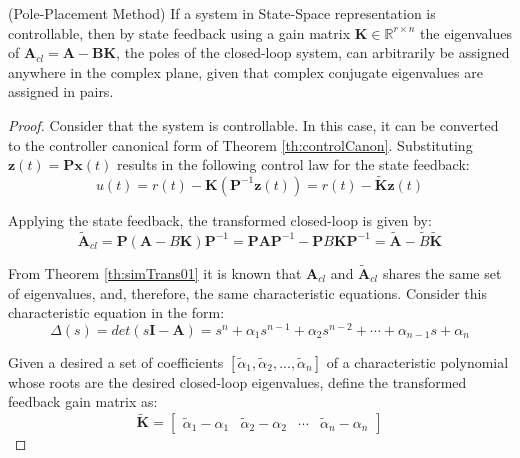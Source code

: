 \documentclass[a4paper,11pt]{book}
\numberwithin{figure}{chapter}
\numberwithin{equation}{chapter}
\numberwithin{table}{chapter}
\newtheorem{theorem}{Theorem}[chapter]
\theoremstyle{definition}
\newcounter{boxed-theorem}
\newenvironment{boxed-theorem}[1]
{\begin{shaded} \begin{theorem}{#1}}
{\end{theorem} \end{shaded}}
\newcounter{boxed-definition}
\begin{document}
\begin{boxed-theorem}{(Pole-Placement Method)} \label{th:polePlace}
	If a system in State-Space representation is controllable, then by state feedback using a gain matrix $\bm{K} \in \mathbb{R}^{r \times n}$ the eigenvalues of $\bm{A}_{cl}=\bm{A}-\bm{B}\bm{K}$, the poles of the closed-loop system, can arbitrarily be assigned anywhere in the complex plane, given that complex conjugate eigenvalues are assigned in pairs.
\end{boxed-theorem} 

\begin{proof}
	Consider that the system is controllable. In this case, it can be converted to the controller canonical form of Theorem \ref{th:controlCanon}. Substituting $\bm{z}(t) = \bm{P} \bm{x}(t)$ results in the following control law for the state feedback:
	\begin{equation}
		u(t) = r(t) - \bm{K} \left( \bm{P}^{-1} \bm{z}(t) \right) = r(t) - \tilde{\bm{K}} \bm{z}(t)
	\end{equation}
	
	Applying the state feedback, the transformed closed-loop is given by:
	\begin{equation} \label{eq:fdbckContrCanon}
	\tilde{\bm{A}}_{cl} = \bm{P} (\bm{A} - B \bm{K}) \bm{P}^{-1} = \bm{P} \bm{A} \bm{P}^{-1} - \bm{P} B \bm{K} \bm{P}^{-1} = \tilde{\bm{A}} - \tilde{B} \tilde{\bm{K}}
	\end{equation}	 
	
	From Theorem \ref{th:simTrans01} it is known that $\bm{A}_{cl}$ and $\tilde{\bm{A}}_{cl}$ shares the same set of eigenvalues, and, therefore, the same characteristic equations. Consider this characteristic equation in the form:
	\begin{equation}
		\Delta(s) = det(s\bm{I} - \bm{A}) = s^n + \alpha_1 s^{n-1} + \alpha_2 s^{n-2} + \cdots + \alpha_{n-1} s + \alpha_n
	\end{equation}
	
	Given a desired a set of coefficients $[\tilde{\alpha}_1, \tilde{\alpha}_2, ..., \tilde{\alpha}_n]$ of a characteristic polynomial whose roots are the desired closed-loop eigenvalues, define the transformed feedback gain matrix as:
	\begin{equation}
		\tilde{\bm{K}} = \begin{bmatrix} \tilde{\alpha}_1 - \alpha_1 & \tilde{\alpha}_2 - \alpha_2 & \cdots & \tilde{\alpha}_n - \alpha_n \end{bmatrix}
	\end{equation}
	

\end{proof}
\end{document}
